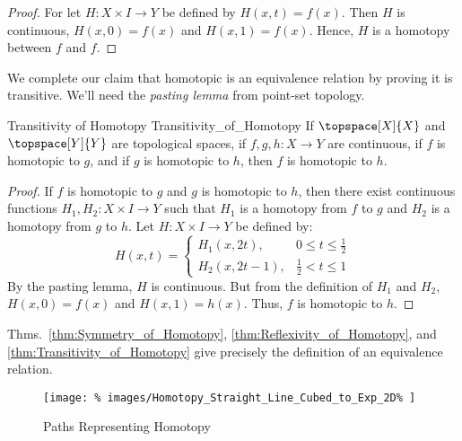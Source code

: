 \documentclass[oneside]{book}                                                  %
\begin{document}
                \begin{proof}
                    For let $H:X\times{I}\rightarrow{Y}$ be defined by
                    $H(x,t)=f(x)$. Then $H$ is continuous, $H(x,0)=f(x)$ and
                    $H(x,1)=f(x)$. Hence, $H$ is a homotopy between $f$ and $f$.
                \end{proof}
                We complete our claim that homotopic is an equivalence relation
                by proving it is transitive. We'll need the
                \textit{pasting lemma} from point-set topology.
                \begin{ltheorem}{Transitivity of Homotopy}
                                {Transitivity_of_Homotopy}
                    If $\topspace[X]{X}$ and $\topspace[Y]{Y}$ are topological
                    spaces, if $f,g,h:X\rightarrow{Y}$ are continuous, if $f$ is
                    homotopic to $g$, and if $g$ is homotopic to $h$, then $f$
                    is homotopic to $h$.
                \end{ltheorem}
                \begin{proof}
                    If $f$ is homotopic to $g$ and $g$ is homotopic to $h$, then
                    there exist continuous functions
                    $H_{1},H_{2}:X\times{I}\rightarrow{Y}$ such that $H_{1}$ is
                    a homotopy from $f$ to $g$ and $H_{2}$ is a homotopy from
                    $g$ to $h$. Let $H:X\times{I}\rightarrow{Y}$ be defined by:
                    \begin{equation}
                        H(x,t)=
                        \begin{cases}
                            H_{1}(x,2t),&{0}\leq{t}\leq\frac{1}{2}\\
                            H_{2}(x,2t-1),&\frac{1}{2}<{t}\leq{1}
                        \end{cases}
                    \end{equation}
                    By the pasting lemma, $H$ is continuous. But from the
                    definition of $H_{1}$ and $H_{2}$, $H(x,0)=f(x)$ and
                    $H(x,1)=h(x)$. Thus, $f$ is homotopic to $h$.
                \end{proof}
                Thms.~\ref{thm:Symmetry_of_Homotopy},
                \ref{thm:Reflexivity_of_Homotopy}, and
                \ref{thm:Transitivity_of_Homotopy} give precisely the definition
                of an equivalence relation.
                \begin{figure}
                    \centering
                    \captionsetup{type=figure}
                    \texttt{[image: \%
                        images/Homotopy\_Straight\_Line\_Cubed\_to\_Exp\_2D\%
                    ]}
                    \caption{Paths Representing Homotopy}
                    \label{fig:Paths_Representing_Homotopy}
                \end{figure}
\end{document}
